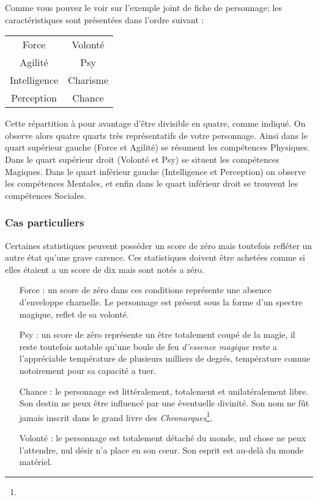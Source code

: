 Comme vous pouvez le voir sur l’exemple joint de fiche de personnage; 
les caractéristiques sont présentées dans l’ordre suivant :
\begin{center}
\begin{tabular}{c|c}
    Force &Volonté \\
    Agilité & Psy \\
    \hline
    Intelligence & Charisme\\
    Perception & Chance
\end{tabular}
\end{center}
Cette répartition à pour avantage d’être divisible en quatre, comme indiqué. On observe alors quatre quarts très représentatifs de votre personnage. Ainsi dans le quart supérieur gauche (Force et Agilité) se résument les compétences Physiques. 
Dans le quart supérieur droit (Volonté et Psy) se situent les compétences Magiques. Dans le quart inférieur gauche (Intelligence et Perception) on observe les compétences Mentales, 
et enfin dans le quart inférieur droit se trouvent les compétences Sociales.

\subsubsection{Cas particuliers}
Certaines statistiques peuvent posséder un score de zéro mais toutefois refléter un autre état qu'une grave carence.
Ces statistiques doivent être achetées comme si elles étaient a un score de dix mais sont notés a zéro.
\begin{itemize}
    \item[Force :] un score de zéro dans ces conditions représente une absence d'enveloppe charnelle. Le personnage est présent sous la forme d'un spectre magique, reflet de sa volonté.
    \item[Psy :] un score de zéro représente un être totalement coupé de la magie, il reste toutefois notable qu'une boule de feu {\em d'essence magique} reste a l'appréciable température de plusieurs milliers de degrés, température connue notoirement pour sa capacité a tuer. 
    \item[Chance :] le personnage est littéralement, totalement et unilatéralement libre. Son destin ne peux être influencé par une éventuelle divinité. Son nom ne fût jamais inscrit dans le grand livre des {\em Chronarques}\footnote{}.
    \item[Volonté :] le personnage est totalement détaché du monde, nul chose ne peux l'attendre, nul désir n'a place en son cœur. Son esprit est au-delà du monde matériel.
\end{itemize}

